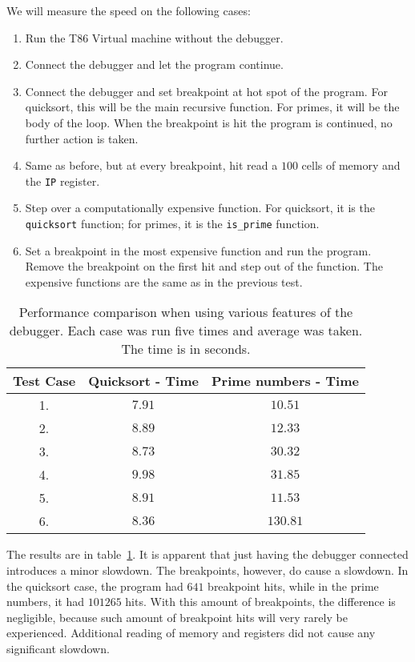
We will measure the speed on the following cases:
\begin{enumerate}
    \item Run the T86 Virtual machine without the debugger.
    \item Connect the debugger and let the program continue.
    \item Connect the debugger and set breakpoint at hot spot of the program.
        For quicksort, this will be the main recursive function. For primes, it
        will be the body of the loop. When the breakpoint is hit the program is
        continued, no further action is taken.
    \item Same as before, but at every breakpoint, hit read a $100$ cells of
        memory and the \texttt{IP} register.
    \item  Step over a computationally expensive function. For quicksort, it is
        the \texttt{quicksort} function; for primes, it is the \verb|is_prime|
        function.
    \item Set a breakpoint in the most expensive function and run the program.
        Remove the breakpoint on the first hit and step out of the function.
        The expensive functions are the same as in the previous test.
\end{enumerate}

\begin{table}[]
\centering
\begin{tabular}{||c c c||}
\hline
Test Case & Quicksort - Time & Prime numbers - Time \\
\hline\hline
1. & $7.91$            & $10.51$  \\
2. & $8.89$            & $12.33$  \\
3. & $8.73$            & $30.32$  \\
4. & $9.98$             & $31.85$  \\
5. & $8.91$            & $11.53$  \\
6. & $8.36$            & $130.81$ \\
\hline
\end{tabular}
\caption{Performance comparison when using various features of the debugger.
    Each case was run five times and average was taken. The time is in
    seconds.}
\label{table:benchmark}
\end{table}

The results are in table~\ref{table:benchmark}. It is apparent that just having
the debugger connected introduces a minor slowdown. The breakpoints, however,
do cause a slowdown. In the quicksort case, the program had $641$ breakpoint
hits, while in the prime numbers, it had $101265$ hits. With this amount  of
breakpoints, the difference is negligible, because such amount of breakpoint
hits will very rarely be experienced. Additional reading of memory and
registers did not cause any significant slowdown.

